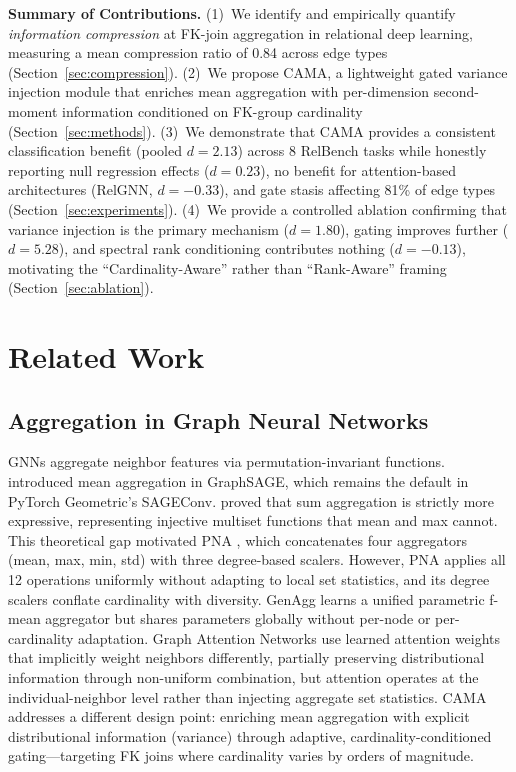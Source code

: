 \documentclass[11pt,letterpaper]{article}
\begin{document}
\textbf{Summary of Contributions.} (1)~We identify and empirically quantify \emph{information compression} at FK-join aggregation in relational deep learning, measuring a mean compression ratio of 0.84 across edge types (Section~\ref{sec:compression}). (2)~We propose CAMA, a lightweight gated variance injection module that enriches mean aggregation with per-dimension second-moment information conditioned on FK-group cardinality (Section~\ref{sec:methods}). (3)~We demonstrate that CAMA provides a consistent classification benefit (pooled $d = 2.13$) across 8 RelBench tasks while honestly reporting null regression effects ($d = 0.23$), no benefit for attention-based architectures (RelGNN, $d = -0.33$), and gate stasis affecting 81\% of edge types (Section~\ref{sec:experiments}). (4)~We provide a controlled ablation confirming that variance injection is the primary mechanism ($d = 1.80$), gating improves further ($d = 5.28$), and spectral rank conditioning contributes nothing ($d = -0.13$), motivating the ``Cardinality-Aware'' rather than ``Rank-Aware'' framing (Section~\ref{sec:ablation}).


\section{Related Work}
\label{sec:related}

\subsection{Aggregation in Graph Neural Networks}

GNNs aggregate neighbor features via permutation-invariant functions. \citet{Hamilton2017} introduced mean aggregation in GraphSAGE, which remains the default in PyTorch Geometric's SAGEConv. \citet{Xu2019} proved that sum aggregation is strictly more expressive, representing injective multiset functions that mean and max cannot. This theoretical gap motivated PNA \citep{Corso2020}, which concatenates four aggregators (mean, max, min, std) with three degree-based scalers. However, PNA applies all 12 operations uniformly without adapting to local set statistics, and its degree scalers conflate cardinality with diversity. GenAgg \citep{Kortvelesy2023} learns a unified parametric f-mean aggregator but shares parameters globally without per-node or per-cardinality adaptation. Graph Attention Networks \citep{Velickovic2018} use learned attention weights that implicitly weight neighbors differently, partially preserving distributional information through non-uniform combination, but attention operates at the individual-neighbor level rather than injecting aggregate set statistics. CAMA addresses a different design point: enriching mean aggregation with explicit distributional information (variance) through adaptive, cardinality-conditioned gating---targeting FK joins where cardinality varies by orders of magnitude.
\end{document}
